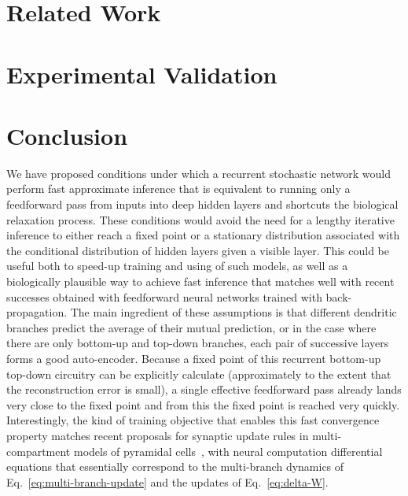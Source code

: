 \documentclass{article}
\begin{document}
\section{Related Work}

\cite{Scellier+Bengio-arxiv2016}

\citep{Xie+Seung-2003}

\section{Experimental Validation}
\fi

\section{Conclusion}

We have proposed conditions under which a recurrent stochastic network would perform fast approximate inference
that is equivalent to running only a feedforward pass from inputs into deep hidden layers and shortcuts
the biological relaxation process. These conditions
would avoid the need for a lengthy iterative inference to either reach a fixed point or a stationary distribution
associated with the conditional distribution of hidden layers given a visible layer. This could be useful
both to speed-up training and using of such models, as well as a biologically plausible way to achieve
fast inference that matches well with recent successes obtained with feedforward neural networks trained
with back-propagation. The main ingredient of these assumptions is that different dendritic branches
predict the average of their mutual prediction, or in the case where there are only bottom-up
and top-down branches, each pair of successive layers
forms a good auto-encoder. Because a fixed point of this recurrent bottom-up top-down circuitry
can be explicitly calculate (approximately to the extent that the reconstruction error is small),
a single effective feedforward pass already lands very close to the fixed point and from this
the fixed point is reached very quickly.
Interestingly, the kind of training objective that enables this fast convergence property
matches recent proposals for synaptic update rules
in multi-compartment models of pyramidal cells~\citep{Urbanczik+Senn-2014}, with neural computation
differential equations that essentially correspond to the multi-branch dynamics
of Eq.~\ref{eq:multi-branch-update} and the updates of Eq.~\ref{eq:delta-W}.
\end{document}
